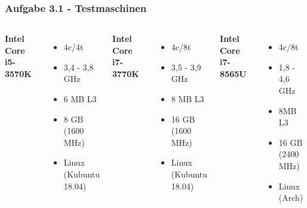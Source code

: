 \documentclass[aspectratio=169]{beamer}
\begin{document}
\begin{frame}
\frametitle{Aufgabe 3.1 - Testmaschinen}
\begin{columns}[c] %
	
	\textbf{Intel Core i5-3570K}
	\begin{itemize}
		\item 4c/4t
		\item 3,4 - 3,8 GHz
		\item 6 MB L3
		\item 8 GB (1600 MHz)
		\item Linux (Kubuntu 18.04)
		
	\end{itemize}
	
	\textbf{Intel Core i7-3770K}
	\begin{itemize}
		\item 4c/8t
		\item 3,5 - 3,9 GHz
		\item 8 MB L3
		\item 16 GB (1600 MHz)
		\item Linux (Kubuntu 18.04)
		
	\end{itemize}
	

	\textbf{Intel Core i7-8565U}
	\begin{itemize}
		\item 4c/8t
		\item 1,8 - 4,6 GHz
		\item 8MB L3
		\item 16 GB (2400 MHz)
		\item Linux (Arch)
	\end{itemize}

\end{columns}
\end{frame}

\end{document}
